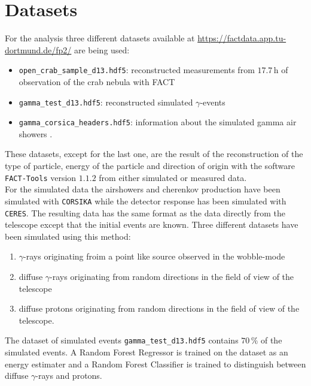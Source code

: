 \section{Datasets}
\label{sec:Durchführung}
For the analysis three different datasets available at \href{https://factdata.app.tu-dortmund.de/fp2/}{https://factdata.app.tu-dortmund.de/fp2/} are being used:
\begin{itemize}
    \item \texttt{open\_crab\_sample\_d13.hdf5}: reconstructed measurements from $17.7 \, \text{h}$ of observation of the crab nebula with FACT
    \item \texttt{gamma\_test\_d13.hdf5}: reconstructed simulated $\gamma$-events
    \item \texttt{gamma\_corsica\_headers.hdf5}: information about the simulated gamma air showers .
\end{itemize}
These datasets, except for the last one, are the result of the reconstruction of the type of particle, energy of the particle and direction
of origin with the software \texttt{FACT-Tools} version $1.1.2$ \cite{FACT-tools} from either simulated or measured data. \\
For the simulated data the airshowers and cherenkov production have been simulated with \texttt{CORSIKA} \cite{CORSIKA} while the detector response has been simulated with
\texttt{CERES}. The resulting data has the same format as the data directly from the telescope except that the initial events are known.
Three different datasets have been simulated using this method:
\begin{enumerate}
    \item $\gamma$-rays originating froim a point like source observed in the wobble-mode
    \item diffuse $\gamma$-rays originating from random directions in the field of view of the telescope
    \item diffuse protons originating from random directions in the field of view of the telescope.
\end{enumerate}
The dataset of simulated events \texttt{gamma\_test\_d13.hdf5} contains $70 \, \%$ of the simulated events.
A Random Forest Regressor is trained on the dataset as an energy estimater and a Random Forest Classifier is trained to distinguish between diffuse
$\gamma$-rays and protons.

